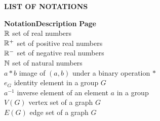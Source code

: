 \cleardoublepage{}
\begin{center}
{\bf LIST OF NOTATIONS}\\[36pt]
\end{center}
{\baselineskip
\begin{tabbing}
\={\bf Notation}\hspace{0.7in}\={\bf Description} \hspace{2.4in}\={\bf Page}\\[18pt] 
\>$\mathbb{R}$	    \>set of real numbers			                        \> \pageref{real}\\[12pt]
\>$\mathbb{R}^+$	  \>set of positive real numbers	                 \> \pageref{preal}\\[12pt]
\>$\mathbb{R}^-$   \>set of negative real numbers		                \> \pageref{nreal}\\[12pt]
\>$\mathbb{N}$		   \>set of natural numbers		                      \> \pageref{nat}\\[12pt]
\>$a*b$    \>image of $(a,b)$ under a binary operation $*$	\> \pageref{binop}\\[12pt]
\>$e_G$    \>identity element in a group $G$		             \> \pageref{ident}\\[12pt]
\>$a^{-1}$ \>inverse element of an element $a$ in a group		\> \pageref{ident}\\[12pt]
\>$V(G)$	  \>vertex set of a graph $G$		                   \> \pageref{vg}\\[12pt]
\>$E(G)$	  \>edge set of a graph $G$		                     \> \pageref{eg}
\end{tabbing}
}